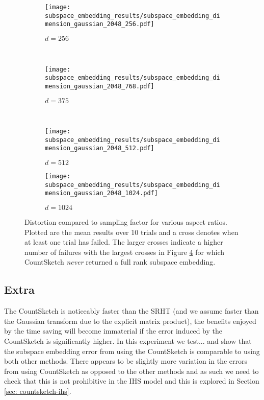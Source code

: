 \begin{figure}
    \centering
    \begin{subfigure}[b]{0.22\textwidth}
        \texttt{[image: subspace\_embedding\_results/subspace\_embedding\_dimension\_gaussian\_2048\_256.pdf]}
        \caption{$d=256$}
        \label{fig: subspace-125e3-aspectratio}
    \end{subfigure}
    ~ %
    \begin{subfigure}[b]{0.22\textwidth}
        \texttt{[image: subspace\_embedding\_results/subspace\_embedding\_dimension\_gaussian\_2048\_768.pdf]}
        \caption{$d=375$}
        \label{fig: subspace-375e1-aspectratio}
    \end{subfigure}
    ~ %
    \begin{subfigure}[b]{0.22\textwidth}
        \texttt{[image: subspace\_embedding\_results/subspace\_embedding\_dimension\_gaussian\_2048\_512.pdf]}
        \caption{$d=512$}
        \label{fig: subspace-25e1-aspectratio}
    \end{subfigure}
    \begin{subfigure}[b]{0.22\textwidth}
        \texttt{[image: subspace\_embedding\_results/subspace\_embedding\_dimension\_gaussian\_2048\_1024.pdf]}
        \caption{$d=1024$}
        \label{fig: subspace-5e1-aspectratio}
    \end{subfigure}
    \caption{Distortion compared to sampling factor for various aspect ratios.
    Plotted are the mean results over 10 trials and a cross denotes when at least
    one trial has failed.
    The larger crosses indicate a higher number of failures with the largest
    crosses in Figure \ref{fig: subspace-5e1-aspectratio} for which CountSketch
    \textit{never} returned a full rank subspace embedding.}
    \label{fig: distortion-sampling-factor}
\end{figure}



\subsection{Extra}
The CountSketch is noticeably faster than the SRHT (and we assume
 faster
than the Gaussian transform due to the explicit matrix product), the benefits
enjoyed by the time saving will become immaterial if the error induced by the
CountSketch is significantly higher.
In this experiment we test... and show that the subspace embedding error from
using the CountSketch is comparable to using both other methods.
There appears to be slightly more variation in the errors from using CountSketch
as opposed to the other methods and as such we need to check that this is not
prohibitive in the IHS model and this is explored in Section
\ref{sec: countsketch-ihs}.

